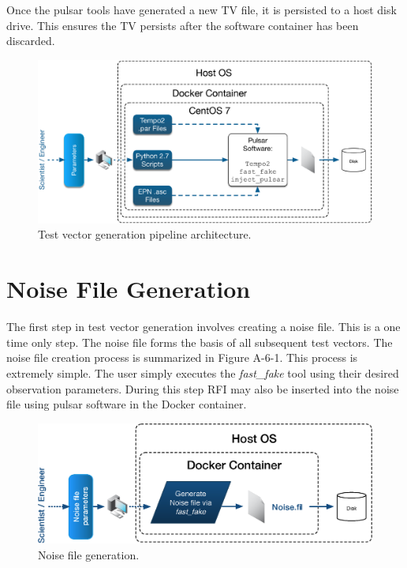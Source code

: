 \documentclass[preprint,authoryear,5p,twocolumn]{elsarticle_mod}
\begin{document}
Once the pulsar tools have generated a new TV file, it is persisted to a host disk drive. This ensures the TV persists after the software container has been discarded. 

\begin{figure}
	\centering
		\includegraphics[scale=0.5]{images/eps/TestVectorDiagrams.eps}
		\caption[]{Test vector generation pipeline architecture.}
	\label{Fig:Arch}
\end{figure}

\section{Noise File Generation}
The first step in test vector generation involves creating a noise file. This is a one time only step. The noise file forms the basis of all subsequent test vectors. The noise file creation process is summarized in Figure A-6-1. This process is extremely simple. The user simply executes the \textit{fast\_fake} tool using their desired observation parameters. During this step RFI may also be inserted into the noise file using pulsar software in the Docker container. 
\begin{figure}
	\centering
		\includegraphics[scale=0.4]{images/eps/NoiseGen.eps}
		\caption[]{Noise file generation.}
	\label{Fig:Noise}
\end{figure}
\end{document}
